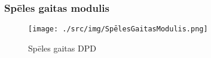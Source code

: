 \subsubsection{Spēles gaitas modulis}

\begin{figure}[htbp]
	\centering
	\texttt{[image: ./src/img/SpēlesGaitasModulis.png]}
	\caption{Spēles gaitas DPD}
	\label{fig:dpd-2-game-progress}
\end{figure}





